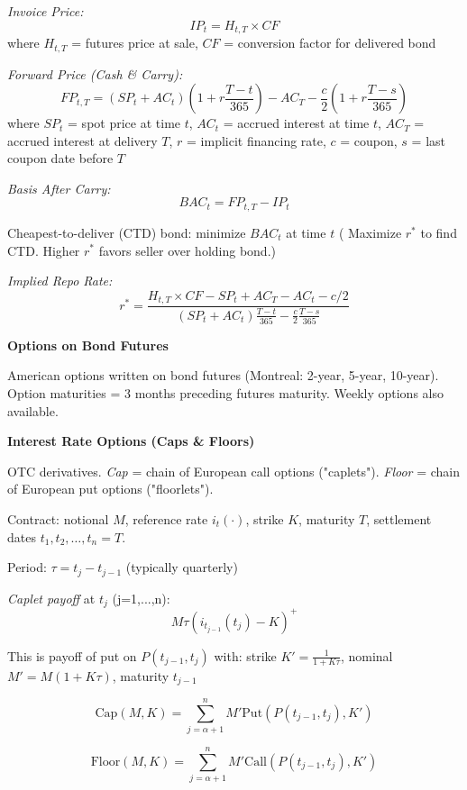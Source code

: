 \documentclass[12pt,a4paper]{article}
\begin{document}
\textit{Invoice Price:} 
$$IP_t = H_{t,T} \times CF$$
where $H_{t,T}$ = futures price at sale, $CF$ = conversion factor for delivered bond

\textit{Forward Price (Cash \& Carry):}
$$FP_{t,T} = (SP_t + AC_t)\left(1 + r\frac{T-t}{365}\right) - AC_T - \frac{c}{2}\left(1 + r\frac{T-s}{365}\right)$$
where $SP_t$ = spot price at time $t$, $AC_t$ = accrued interest at time $t$, $AC_T$ = accrued interest at delivery $T$, $r$ = implicit financing rate, $c$ = coupon, $s$ = last coupon date before $T$

\textit{Basis After Carry:}
$$BAC_t = FP_{t,T} - IP_t$$

Cheapest-to-deliver (CTD) bond: minimize $BAC_t$ at time $t$ ( Maximize $r^*$ to find CTD. Higher $r^*$ favors seller over holding bond.)

\textit{Implied Repo Rate:}
$$r^* = \frac{H_{t,T} \times CF - SP_t + AC_T - AC_t - c/2}{(SP_t + AC_t)\frac{T-t}{365} - \frac{c}{2}\frac{T-s}{365}}$$

\vspace{0.5em}

\textbf{Options on Bond Futures}
\vspace{0.5em}

American options written on bond futures (Montreal: 2-year, 5-year, 10-year). Option maturities = 3 months preceding futures maturity. Weekly options also available.

\vspace{0.5em}

\textbf{Interest Rate Options (Caps \& Floors)}
\vspace{0.5em}

OTC derivatives. \textit{Cap} = chain of European call options ("caplets"). \textit{Floor} = chain of European put options ("floorlets").

Contract: notional $M$, reference rate $i_t(\cdot)$, strike $K$, maturity $T$, settlement dates $t_1, t_2, \ldots, t_n = T$.

Period: $\tau = t_j - t_{j-1}$ (typically quarterly)

\textit{Caplet payoff} at $t_j$ (j=1,...,n): 
$$M\tau(i_{t_{j-1}}(t_j) - K)^+$$

This is payoff of put on $P(t_{j-1}, t_j)$ with: strike $K' = \frac{1}{1 + K\tau}$, nominal $M' = M(1 + K\tau)$, maturity $t_{j-1}$

$$\text{Cap}(M, K) = \sum_{j=\alpha+1}^{n} M' \text{Put}(P(t_{j-1}, t_j), K')$$

$$\text{Floor}(M, K) = \sum_{j=\alpha+1}^{n} M' \text{Call}(P(t_{j-1}, t_j), K')$$
\end{document}
